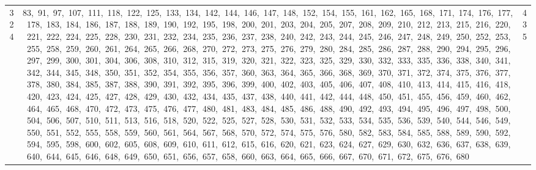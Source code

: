 \begin{longtable}{c|p{}|r}
324 & 83,\ 91,\ 97,\ 107,\ 111,\ 118,\ 122,\ 125,\ 133,\ 134,\ 142,\ 144,\ 146,\ 147,\ 148,\ 152,\ 154,\ 155,\ 161,\ 162,\ 165,\ 168,\ 171,\ 174,\ 176,\ 177,\ 178,\ 183,\ 184,\ 186,\ 187,\ 188,\ 189,\ 190,\ 192,\ 195,\ 198,\ 200,\ 201,\ 203,\ 204,\ 205,\ 207,\ 208,\ 209,\ 210,\ 212,\ 213,\ 215,\ 216,\ 220,\ 221,\ 222,\ 224,\ 225,\ 228,\ 230,\ 231,\ 232,\ 234,\ 235,\ 236,\ 237,\ 238,\ 240,\ 242,\ 243,\ 244,\ 245,\ 246,\ 247,\ 248,\ 249,\ 250,\ 252,\ 253,\ 255,\ 258,\ 259,\ 260,\ 261,\ 264,\ 265,\ 266,\ 268,\ 270,\ 272,\ 273,\ 275,\ 276,\ 279,\ 280,\ 284,\ 285,\ 286,\ 287,\ 288,\ 290,\ 294,\ 295,\ 296,\ 297,\ 299,\ 300,\ 301,\ 304,\ 306,\ 308,\ 310,\ 312,\ 315,\ 319,\ 320,\ 321,\ 322,\ 323,\ 325,\ 329,\ 330,\ 332,\ 333,\ 335,\ 336,\ 338,\ 340,\ 341,\ 342,\ 344,\ 345,\ 348,\ 350,\ 351,\ 352,\ 354,\ 355,\ 356,\ 357,\ 360,\ 363,\ 364,\ 365,\ 366,\ 368,\ 369,\ 370,\ 371,\ 372,\ 374,\ 375,\ 376,\ 377,\ 378,\ 380,\ 384,\ 385,\ 387,\ 388,\ 390,\ 391,\ 392,\ 395,\ 396,\ 399,\ 400,\ 402,\ 403,\ 405,\ 406,\ 407,\ 408,\ 410,\ 413,\ 414,\ 415,\ 416,\ 418,\ 420,\ 423,\ 424,\ 425,\ 427,\ 428,\ 429,\ 430,\ 432,\ 434,\ 435,\ 437,\ 438,\ 440,\ 441,\ 442,\ 444,\ 448,\ 450,\ 451,\ 455,\ 456,\ 459,\ 460,\ 462,\ 464,\ 465,\ 468,\ 470,\ 472,\ 473,\ 475,\ 476,\ 477,\ 480,\ 481,\ 483,\ 484,\ 485,\ 486,\ 488,\ 490,\ 492,\ 493,\ 494,\ 495,\ 496,\ 497,\ 498,\ 500,\ 504,\ 506,\ 507,\ 510,\ 511,\ 513,\ 516,\ 518,\ 520,\ 522,\ 525,\ 527,\ 528,\ 530,\ 531,\ 532,\ 533,\ 534,\ 535,\ 536,\ 539,\ 540,\ 544,\ 546,\ 549,\ 550,\ 551,\ 552,\ 555,\ 558,\ 559,\ 560,\ 561,\ 564,\ 567,\ 568,\ 570,\ 572,\ 574,\ 575,\ 576,\ 580,\ 582,\ 583,\ 584,\ 585,\ 588,\ 589,\ 590,\ 592,\ 594,\ 595,\ 598,\ 600,\ 602,\ 605,\ 608,\ 609,\ 610,\ 611,\ 612,\ 615,\ 616,\ 620,\ 621,\ 623,\ 624,\ 627,\ 629,\ 630,\ 632,\ 636,\ 637,\ 638,\ 639,\ 640,\ 644,\ 645,\ 646,\ 648,\ 649,\ 650,\ 651,\ 656,\ 657,\ 658,\ 660,\ 663,\ 664,\ 665,\ 666,\ 667,\ 670,\ 671,\ 672,\ 675,\ 676,\ 680 & 435 \\

\end{longtable}
